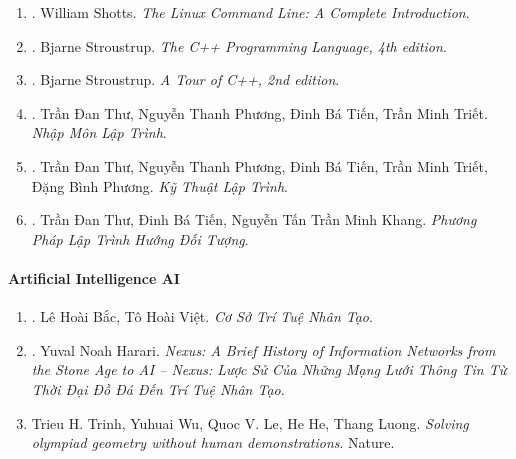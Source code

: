 \documentclass{article}
\begin{document}
\begin{enumerate}
	\item \cite{Shotts2019}. {\sc William Shotts}. {\it The Linux Command Line: A Complete Introduction}.\hfill{\sf[reading]}
	
	\item \cite{Stroustrup2013}. {\sc Bjarne Stroustrup}. {\it The C++ Programming Language, 4th edition}.\hfill{\sf[reading]}
	
	\item \cite{Stroustrup2018}. Bjarne Stroustrup. {\it A Tour of C++, 2nd edition}.\hfill{\sf[reading]}
	
	\item \cite{Thu_Phuong_Tien_Triet_NMLT}. Trần Đan Thư, Nguyễn Thanh Phương, Đinh Bá Tiến, Trần Minh Triết. {\it Nhập Môn Lập Trình}.\hfill{\sf[reading]}
	
	\item \cite{Thu_Phuong_Tien_Triet_Phuong_KTLT}. Trần Đan Thư, Nguyễn Thanh Phương, Đinh Bá Tiến, Trần Minh Triết, Đặng Bình Phương. {\it Kỹ Thuật Lập Trình}.\hfill{\sf[reading]}
	
	\item \cite{Thu_Tien_Khang_PPLTHDT}. Trần Đan Thư, Đinh Bá Tiến, Nguyễn Tấn Trần Minh Khang. {\it Phương Pháp Lập Trình Hướng Đối Tượng}.\hfill{\sf[reading]}
\end{enumerate}

\paragraph{Artificial Intelligence AI}

\begin{enumerate}
	\item \cite{Bac_Viet_AI}. {\sc Lê Hoài Bắc, Tô Hoài Việt}. {\it Cơ Sở Trí Tuệ Nhân Tạo}.\hfill{\sf[done]}
	
	\item \cite{Harari_Nexus_VN}. {\sc Yuval Noah Harari}. {\it Nexus: A Brief History of Information Networks from the Stone Age to AI -- Nexus: Lược Sử Của Những Mạng Lưới Thông Tin Từ Thời Đại Đồ Đá Đến Trí Tuệ Nhân Tạo}.\hfill{\sf[reading]}
	
	\item {\sc Trieu H. Trinh, Yuhuai Wu, Quoc V. Le, He He, Thang Luong}. {\it Solving olympiad geometry without human demonstrations}. Nature.\hfill{\sf[reading]}
\end{enumerate}

\end{document}
